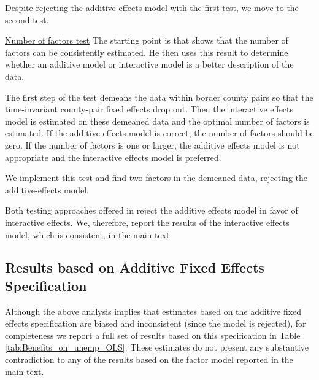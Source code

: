 \documentclass[12pt]{article}
\newcommand{\1}{\mathbf{1}}
\begin{document}
\begin{appendix}
Despite rejecting the additive effects model with the first test, we move to the second test.

\underline{Number of factors test}
The starting point is that \citet{bai:09} shows that the number of factors can be consistently estimated. He then uses this result to determine whether an additive model or interactive model is a better description of the data.

The first step of the test demeans the data within border county pairs so that the time-invariant county-pair fixed effects drop out. Then the interactive effects model is estimated on these demeaned data and the optimal number of factors is estimated. If the additive effects model is correct, the number of factors should be zero. If the number of factors is one or larger, the additive effects model is not appropriate and the interactive effects model is preferred.

We implement this test and find two factors in the demeaned data, rejecting the additive-effects model.

Both testing approaches offered in \citet{bai:09} reject the additive effects model in favor of interactive effects. We, therefore, report the results of the interactive effects model, which is consistent, in the main text.

\subsection{Results based on Additive Fixed Effects Specification}
Although the above analysis implies that estimates based on the additive fixed effects specification are biased and inconsistent (since the model is rejected), for completeness we report a full set of results based on this specification in Table \ref{tab:Benefits_on_unemp_OLS}. These estimates do not present any substantive contradiction to any of the results based on the factor model reported in the main text.



\end{appendix}
\end{document}

